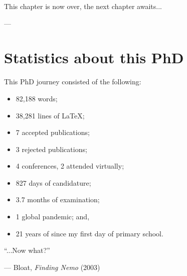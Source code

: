 \bigskip
\noindent
This chapter is now over, the next chapter awaits...

\bigskip
\noindent
\hspace{\fill}
\parbox[b]{0.4\linewidth}{
\raggedleft
\small
--- \theauthor{}\\
\thedate{}
}

\chapter*{Statistics about this PhD}

This PhD journey consisted of the following:

\bigskip

\begin{itemize}
    \item 82,188 words;
    \item 38,281 lines of \LaTeX;
    \item 7 accepted publications;
    \item 3 rejected publications;
    \item 4 conferences, 2 attended virtually;
    \item 827 days of candidature;
    \item 3.7 months of examination;
    \item 1 global pandemic; and,
    \item 21 years of since my first day of primary school.
\end{itemize}

\bigskip


\epigraph{``...Now what?''}{--- Bloat, \textit{Finding Nemo} (2003)}